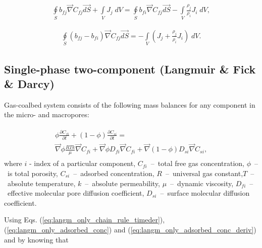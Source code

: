 \documentclass[a4paper,14pt,english]{extreport}
\begin{document}
\begin{eqnarray}
\label{eq:multiphase_diffusivity_simplified_integral}
\oint \limits_{S} b_{fj} \vec{\nabla}C_{fj} \vec{dS}
+ \int \limits_{V} J_{j} \; dV
= \oint \limits_{S} b_{fi} \vec{\nabla}C_{fj} \vec{dS}
-\int \limits_{V} \frac{\rho_j}{\rho_i}J_{i} \; dV,
\end{eqnarray}

\begin{eqnarray}
\label{eq:multiphase_diffusivity_simplified_integral}
\oint \limits_{S} \left(b_{fj}-b_{fi}\right) \vec{\nabla}C_{fj} \vec{dS}
= -\int \limits_{V} \left(J_{j}+\frac{\rho_j}{\rho_i}J_{i}\right) \; dV.
\end{eqnarray}

\subsection*{Single-phase two-component (Langmuir \& Fick \& Darcy)}
Gas-coalbed system consists of the following mass balances for any component in the micro- and macropores:

\begin{eqnarray}
\begin{gathered}
\label{eq:langm_fick_diffusivity_differential}
\phi\frac{\partial C_{fi}}{\partial t} + \left(\mathit{1}-\phi\right)\frac{\partial C_{si}}{\partial t} = \\ \vec{\nabla} \phi\frac{RTk}{\mu} \vec{\nabla}C_{fi} + \vec{\nabla} \phi D_{fi} \vec{\nabla}C_{fi} + \vec{\nabla}\left(\mathit{1}-\phi \right) D_{si} \vec{\nabla}C_{si},
\end{gathered}
\end{eqnarray}
where $i$ - index of  a particular component, $C_{fi}$~--~total free gas concentration, $\phi$~--~is total porosity, $C_{si}$~--~adsorbed concentration, $R$~--~universal gas constant,$T$~--~absolute temperature, $k$~--~absolute permeability, $\mu$~--~dynamic viscosity, $D_{fi}$~--~effective molecular pore diffusion coefficient, $D_{si}$~--~surface molecular diffusion coefficient.

Using Eqs. (\ref{eq:langm_only_chain_rule_timeder}), (\ref{eq:langm_only_adsorbed_conc}) and (\ref{eq:langm_only_adsorbed_conc_deriv}) and by knowing that
\end{document}
